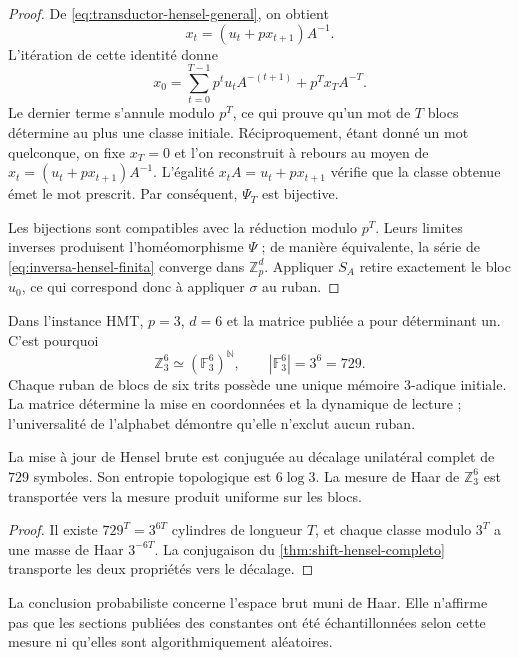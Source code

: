 \begin{proof}
De \cref{eq:transductor-hensel-general}, on obtient
\[
 x_t=(u_t+px_{t+1})A^{-1}.
\]
L'itération de cette identité donne
\[
 x_0=
 \sum_{t=0}^{T-1}p^t u_tA^{-(t+1)}
 +p^Tx_TA^{-T}.
\]
Le dernier terme s'annule modulo \(p^T\), ce qui prouve qu'un mot de
\(T\) blocs détermine au plus une classe initiale. Réciproquement, étant donné
un mot quelconque, on fixe \(x_T=0\) et l'on reconstruit à rebours au moyen de
\(x_t=(u_t+px_{t+1})A^{-1}\). L'égalité
\(x_tA=u_t+px_{t+1}\) vérifie que la classe obtenue émet le mot
prescrit. Par conséquent, \(\Psi_T\) est bijective.

Les bijections sont compatibles avec la réduction modulo \(p^T\). Leurs limites
inverses produisent l'homéomorphisme \(\Psi\) ; de manière équivalente, la série de
\cref{eq:inversa-hensel-finita} converge dans \(\mathbb Z_p^d\). Appliquer
\(S_A\) retire exactement le bloc \(u_0\), ce qui correspond donc à
appliquer \(\sigma\) au ruban.
\end{proof}

Dans l'instance HMT, \(p=3\), \(d=6\) et la matrice publiée a pour
déterminant un. C'est pourquoi
\begin{equation}
 \mathbb Z_3^6\simeq(\mathbb F_3^6)^{\mathbb N},
 \qquad |\mathbb F_3^6|=3^6=729.
 \label{eq:hmt-shift-729}
\end{equation}
Chaque ruban de blocs de six trits possède une unique mémoire 3-adique initiale.
La matrice détermine la mise en coordonnées et la dynamique de lecture ;
l'universalité de l'alphabet démontre qu'elle n'exclut aucun ruban.

\begin{corollary}
La mise à jour de Hensel brute est conjuguée au décalage unilatéral
complet de
\(729\) symboles. Son entropie topologique est \(6\log3\). La mesure de Haar de
\(\mathbb Z_3^6\) est transportée vers la mesure produit uniforme sur les
blocs.
\end{corollary}

\begin{proof}
Il existe \(729^T=3^{6T}\) cylindres de longueur \(T\), et chaque classe modulo
\(3^T\) a une masse de Haar \(3^{-6T}\). La conjugaison du
\cref{thm:shift-hensel-completo} transporte les deux propriétés vers le
décalage.
\end{proof}

La conclusion probabiliste concerne l'espace brut muni de Haar. Elle
n'affirme pas que les sections publiées des constantes ont été échantillonnées
selon cette mesure ni qu'elles sont algorithmiquement aléatoires.

